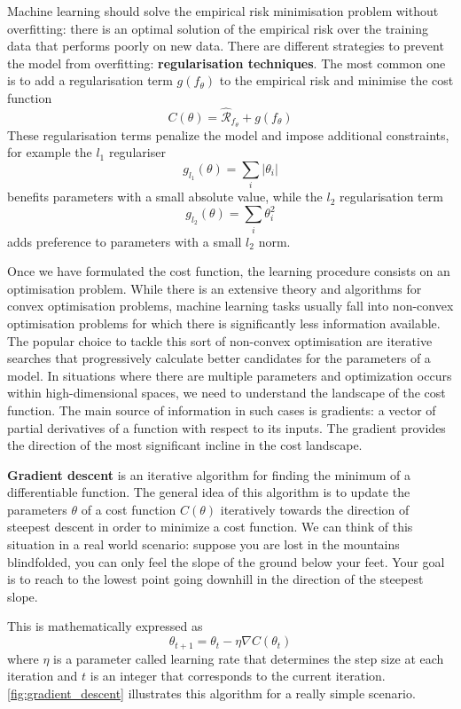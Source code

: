 Machine learning should solve the empirical risk minimisation problem without overfitting: there is an optimal solution of the empirical risk over the training data that performs poorly on new data. There are different strategies to prevent the model from overfitting: \textbf{regularisation techniques}. The most common one is to add a regularisation term $g(f_{\theta})$ to the empirical risk and minimise the cost function
$$C(\theta)=\hat{\mathcal{R}}_{f_{\theta}} + g(f_{\theta})$$
These regularisation terms penalize the model and impose additional constraints, for example the $l_1$ regulariser
$$g_{l_1}(\theta)=\sum_{i}|\theta_i|$$
benefits parameters with a small absolute value, while the $l_2$ regularisation term
$$g_{l_2}(\theta)=\sum_i \theta_i^2$$
adds preference to parameters with a small $l_2$ norm.

Once we have formulated the cost function, the learning procedure consists on an optimisation problem. While there is an extensive theory and algorithms for convex optimisation problems,  machine learning tasks usually fall into non-convex optimisation problems for which there is significantly less information available. The popular choice to tackle this sort of non-convex optimisation are iterative searches that progressively calculate better candidates for the parameters of a model.
In situations where there are multiple parameters and optimization occurs within high-dimensional spaces, we need to understand the landscape of the cost function. The main source of information in such cases is gradients: a vector of partial derivatives of a function with respect to its inputs. The gradient provides the direction of the most significant incline in the cost landscape.

\textbf{Gradient descent} is an iterative algorithm for finding the minimum of a differentiable function. The general idea of this algorithm is to update the parameters $\theta$ of a cost function $C(\theta)$ iteratively towards the direction of steepest descent in order to minimize a cost function. We can think of this situation in a real world scenario: suppose you are lost in the mountains blindfolded, you can only feel the slope of the ground below your feet. Your goal is to reach to the lowest point going downhill in the direction of the steepest slope. 

This is mathematically expressed as
$$\theta_{t+1} = \theta_{t}-\eta\nabla C(\theta_t)$$
where $\eta$ is a parameter called learning rate that determines the step size at each iteration and $t$ is an integer that corresponds to the current iteration. \autoref{fig:gradient_descent} illustrates this algorithm for a really simple scenario.

